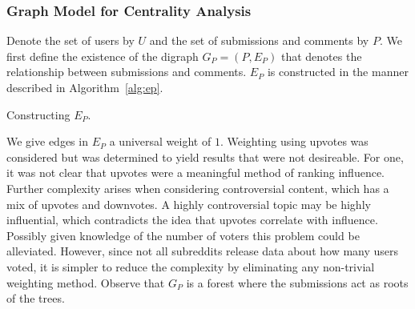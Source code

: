 \documentclass[letterpaper, 10 pt, conference]{ieeeconf}
\theoremstyle{plain}
\begin{document}
\subsubsection{Graph Model for Centrality Analysis}
Denote the set of users by \(U\) and the set of submissions and comments by \(P.\) We first define the existence of the digraph \(G_P=(P,E_P)\) that denotes the relationship between submissions and comments. \(E_P\) is constructed in the manner described in Algorithm~\ref{alg:ep}.
\begin{algorithm}
  \caption{Constructing \(E_P.\)}
  \label{alg:ep}
\end{algorithm}
We give edges in \(E_P\) a universal weight of \(1.\) Weighting using upvotes was considered but was determined to yield results that were not desireable. For one, it was not clear that upvotes were a meaningful method of ranking influence. Further complexity arises when considering controversial content, which has a mix of upvotes and downvotes. A highly controversial topic may be highly influential, which contradicts the idea that upvotes correlate with influence. Possibly given knowledge of the number of voters this problem could be alleviated. However, since not all subreddits release data about how many users voted, it is simpler to reduce the complexity by eliminating any non-trivial weighting method. Observe that \(G_P\) is a forest where the submissions act as roots of the trees.
\end{document}
